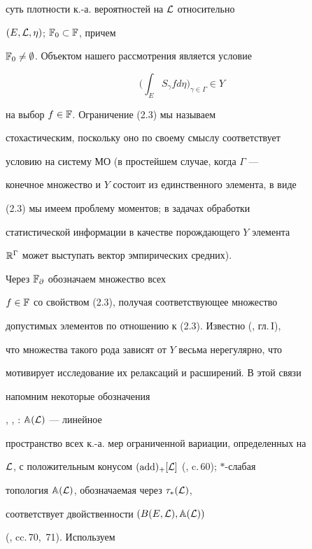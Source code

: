 суть плотности к.-а. вероятностей на ${\cal L}$ относительно 


$(E,{\cal L}, \eta)$; ${\Bbb F}_0 \subset {\Bbb F}$, причем 


${\Bbb F}_0\ne\emptyset$. Объектом нашего рассмотрения является условие


%


\begin{equation}


\biggl(\int_E S_\gamma fd\eta\biggr)_{\gamma \in \Gamma} \in Y


\end{equation}


%


на выбор $f \in {\Bbb F}$. Ограничение (2.3) мы называем


стохастическим, поскольку оно по своему смыслу соответствует


условию на систему МО (в простейшем случае, когда $\Gamma$ ---


конечное множество и $Y$ состоит из единственного элемента, в виде


(2.3) мы имеем проблему моментов; в задачах обработки


статистической информации в качестве порождающего $Y$ элемента


${\Bbb R}^\Gamma$ может выступать вектор эмпирических средних).


Через ${\Bbb F}_\partial$ обозначаем множество всех 


$f \in {\Bbb F}$ со свойством (2.3), получая соответствующее множество


допустимых элементов по отношению к (2.3). Известно (\cite{Ch1}, гл.\,I),


что множества такого рода зависят от $Y$ весьма нерегулярно, что


мотивирует исследование их релаксаций и расширений. В этой связи


напомним некоторые обозначения


\cite{Ch1}, \cite{Ch2}, \cite{Ch3}: ${\Bbb A}({\cal L})$ --- линейное


пространство всех к.-а. мер ограниченной вариации, определенных на


${\cal L}$, с положительным конусом $(\operatorname{add})_+[{\cal L}]$ (\cite{Ch1}, c.\,60); $\ast$-слабая


топология ${\Bbb A}({\cal L})$, обозначаемая через $\tau_*({\cal L})$,


соответствует двойственности $(B(E, {\cal L}), {\Bbb A}({\cal L}))$ 


(\cite{Ch1}, cc.\,70,~71). Используем


